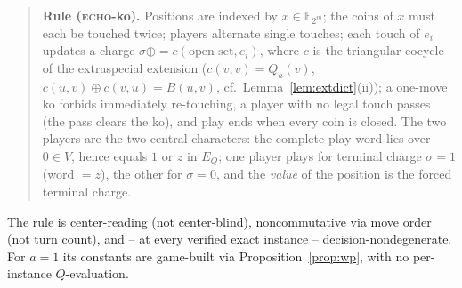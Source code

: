 \documentclass[11pt]{article}
\theoremstyle{plain}
\theoremstyle{definition}
\newcommand{\F}{\mathbb{F}}
\begin{document}
\begin{quote}
\textbf{Rule (\textsc{echo}-ko).} Positions are indexed by
$x\in\F_{2^m}$; the coins of $x$ must each be touched twice; players
alternate single touches; each touch of $e_i$ updates a charge
$\sigma\mathrel{\oplus{=}}c(\text{open-set},e_i)$, where $c$ is the
triangular cocycle of the extraspecial extension
($c(v,v)=Q_a(v)$, $c(u,v)\oplus c(v,u)=B(u,v)$,
cf.\ Lemma~\ref{lem:extdict}(ii)); a one-move ko forbids immediately
re-touching, a player with no legal touch passes (the pass clears the ko),
and play ends when every coin is closed. The two players are the two
central characters: the complete play word lies over $0\in V$, hence equals
$1$ or $z$ in $E_Q$; one player plays for terminal charge $\sigma=1$ (word
$=z$), the other for $\sigma=0$, and the \emph{value} of the position is
the forced terminal charge.
\end{quote}

The rule is center-reading (not center-blind), noncommutative via move
order (not turn count), and -- at every verified exact instance --
decision-nondegenerate. For $a=1$ its constants are game-built via
Proposition~\ref{prop:wp}, with no per-instance $Q$-evaluation.
\end{document}
